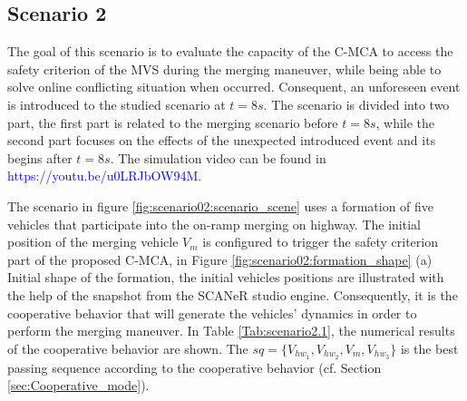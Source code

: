 \newpage
\subsection*{Scenario 2}
The goal of this scenario is to evaluate the capacity of the C-MCA to access the safety criterion of the MVS during the merging maneuver, while being able to solve online conflicting situation when occurred. Consequent, an unforeseen event is introduced to the studied scenario at $t=8s$. The scenario is divided into two part, the first part is related to the merging scenario before $t=8s$, while the second part focuses on the effects of the unexpected introduced event and its begins after $t=8s$. The simulation video can be found in \textcolor{blue}{https://youtu.be/u0LRJbOW94M}.

The scenario in figure \ref{fig:scenario02:scenario_scene} uses a formation of five vehicles that participate into the on-ramp merging on highway. The initial position of the merging vehicle $V_m$ is configured to trigger the safety criterion part of the proposed C-MCA, in Figure \ref{fig:scenario02:formation_shape} (a) Initial shape of the formation, the initial vehicles positions are illustrated with the help of the snapshot from the SCANeR studio engine. Consequently, it is the cooperative behavior that will generate the vehicles' dynamics in order to perform the merging maneuver. In Table \ref{Tab:scenario2.1}, the numerical results of the cooperative behavior are shown. The $sq=\{V_{hw_{1}},V_{hw_{2}},V_{m},V_{hw_{3}}\}$ is the best passing sequence according to the cooperative behavior (cf. Section \ref{sec:Cooperative_mode}). 




